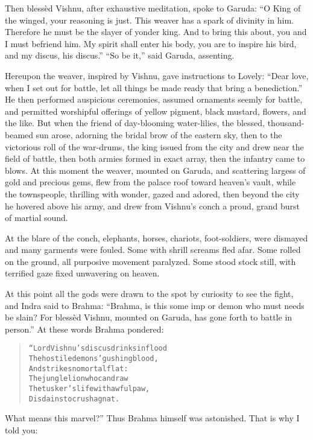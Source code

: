 \documentclass[article, twoside, 14pt]{memoir}
\renewenvironment{verbatim}{%
\begin{quote}%
\vskip -10pt%
\begin{alltt}\normalfont\large}{\end{alltt}%
\end{quote}%
\vskip -10pt
} %
\begin{document}
Then blessèd Vishnu, after exhaustive meditation, spoke to Garuda:
``O King of the winged, your reasoning is just. This weaver has a spark of divinity in him. Therefore he must be the slayer of yonder king. And to bring this about, you and I must befriend him. My spirit shall enter his body, you are to inspire his bird, and my discus, his discus.''
``So be it,'' said Garuda, assenting.

Hereupon the weaver, inspired by Vishnu, gave instructions to
Lovely:
``Dear love, when I set out for battle, let all things be made ready that bring a benediction.''
He then performed auspicious ceremonies, assumed ornaments seemly
for battle, and permitted worshipful offerings of yellow pigment,
black mustard, flowers, and the like. But when the friend of
day-blooming water-lilies, the blessed, thousand-beamed sun arose,
adorning the bridal brow of the eastern sky, then to the victorious
roll of the war-drums, the king issued from the city and drew near
the field of battle, then both armies formed in exact array, then
the infantry came to blows. At this moment the weaver, mounted on
Garuda, and scattering largess of gold and precious gems, flew from
the palace roof toward heaven's vault, while the townspeople,
thrilling with wonder, gazed and adored, then beyond the city he
hovered above his army, and drew from Vishnu's conch a proud, grand
burst of martial sound.

At the blare of the conch, elephants, horses, chariots,
foot-soldiers, were dismayed and many garments were fouled. Some
with shrill screams fled afar. Some rolled on the ground, all
purposive movement paralyzed. Some stood stock still, with
terrified gaze fixed unwavering on heaven.

At this point all the gods were drawn to the spot by curiosity to
see the fight, and Indra said to Brahma:
``Brahma, is this some imp or demon who must needs be slain? For blessèd Vishnu, mounted on Garuda, has gone forth to battle in person.''
At these words Brahma pondered:

\begin{verbatim}
“Lord Vishnu's discus drinks in flood
The hostile demons' gushing blood,
    And strikes no mortal flat:
The jungle lion who can draw
The tusker's life with awful paw,
    Disdains to crush a gnat.
\end{verbatim}
What means this marvel?” Thus Brahma himself was astonished.
That is why I told you:
\end{document}
